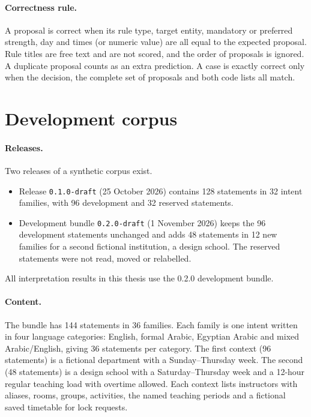 \paragraph{Correctness rule.} A proposal is correct when its rule type, target entity, mandatory or preferred strength, day and times (or numeric value) are all equal to the expected proposal. Rule titles are free text and are not scored, and the order of proposals is ignored. A duplicate proposal counts as an extra prediction. A case is exactly correct only when the decision, the complete set of proposals and both code lists all match.

\section{Development corpus}\label{dataset-construction}

\paragraph{Releases.} Two releases of a synthetic corpus exist.
\begin{itemize}
\item Release \texttt{0.1.0-draft} (25 October 2026) contains 128 statements in 32 intent families, with 96 development and 32 reserved statements.
\item Development bundle \texttt{0.2.0-draft} (1 November 2026) keeps the 96 development statements unchanged and adds 48 statements in 12 new families for a second fictional institution, a design school. The reserved statements were not read, moved or relabelled.
\end{itemize}
All interpretation results in this thesis use the 0.2.0 development bundle.

\paragraph{Content.} The bundle has 144 statements in 36 families. Each family is one intent written in four language categories: English, formal Arabic, Egyptian Arabic and mixed Arabic/English, giving 36 statements per category. The first context (96 statements) is a fictional department with a Sunday--Thursday week. The second (48 statements) is a design school with a Saturday--Thursday week and a 12-hour regular teaching load with overtime allowed. Each context lists instructors with aliases, rooms, groups, activities, the named teaching periods and a fictional saved timetable for lock requests.

